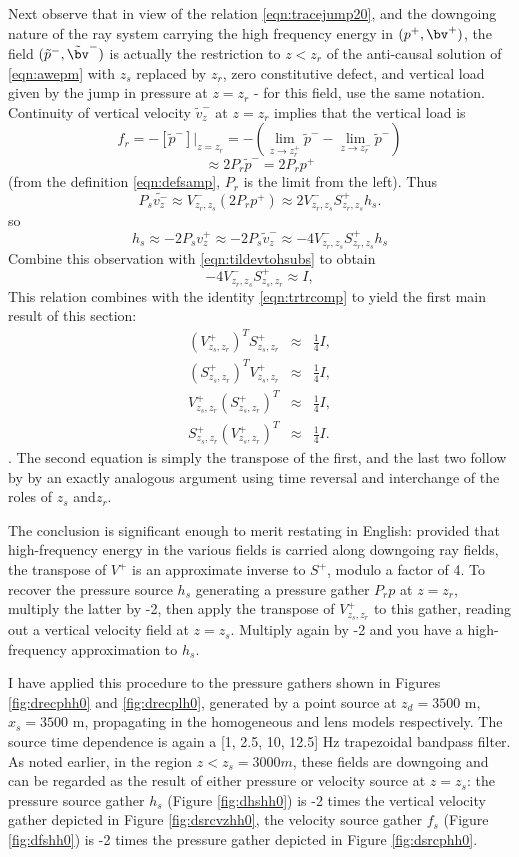 Next observe that in view of the relation \ref{eqn:tracejump20}, and
the downgoing nature of the ray system carrying the high frequency
energy in $(p^+,\bv^+)$, the field $(\tilde{p}^-,\tilde{\bv}^-)$ is
actually the restriction to $z<z_r$ of the anti-causal solution of \ref{eqn:awepm}
with $z_s$ replaced by $z_r$, zero constitutive defect, and vertical
load given by the jump in pressure at $z=z_r$ - for this field, use
the same notation. Continuity of vertical
velocity $\tilde{v}^-_z$ at $z=z_r$ implies that the vertical load is
\[
  f_r = -[\tilde{p}^-]|_{z=z_r} =-(\lim_{z\rightarrow
    z_r^+}\tilde{p}^- - \lim_{z\rightarrow
    z_r^-}\tilde{p}^-)
\]
\[
  \approx 2 P_r \tilde{p}^- = 2 P_r p^+
\]
(from the definition \ref{eqn:defsamp}, $P_r$ is the limit from the
left). Thus
\[
  P_s \tilde{v^-_z} \approx V^-_{z_r,z_s}(2 P_rp^+) \approx
  2V^-_{z_r,z_s}S^+_{z_r,z_s}h_s.
\]
so
\[
  h_s \approx -2 P_s v^+_z \approx -2 P_s \tilde{v}^-_z \approx
  -4V^-_{z_r,z_s}S^+_{z_r,z_s}h_s
\]
Combine this observation with \ref{eqn:tildevtohsubs} to obtain
\[
 -4  V^-_{z_r,z_s} S^+_{z_s,z_r}  \approx  I,
\]
This relation combines with the identity \ref{eqn:trtrcomp} to
yield the first main result of this section:
\begin{eqnarray}
  \label{eqn:approxinv}
  (V^+_{z_s,z_r})^T S^+_{z_s,z_r} & \approx & \frac{1}{4}I, \nonumber\\
  (S^+_{z_s,z_r})^T V^+_{z_s,z_r} & \approx & \frac{1}{4}I, \nonumber\\
  V^+_{z_s,z_r} (S^+_{z_s,z_r})^T & \approx & \frac{1}{4}I, \nonumber\\
  S^+_{z_s,z_r} (V^+_{z_s,z_r})^T & \approx & \frac{1}{4}I.
\end{eqnarray}.
The second equation is simply the transpose of the first, and the
last two follow by by an exactly analogous argument using time
reversal and interchange of the roles of $z_s$ and$z_r$.

The conclusion is significant enough to merit restating in English:
provided that high-frequency energy in the various fields is carried
along downgoing ray fields, the transpose of $V^+$ is an approximate
inverse to $S^+$, modulo a factor of 4. To recover the pressure source
$h_s$ generating a pressure gather $P_rp$ at $z=z_r$, multiply the
latter by -2, then apply the transpose of $V^+_{z_s,z_r}$ to this
gather, reading out a vertical velocity field at $z=z_s$. Multiply
again by -2 and you have a high-frequency approximation to $h_s$.

I have applied this procedure to the pressure gathers shown in Figures
\ref{fig:drecphh0} and \ref{fig:drecplh0}, generated by a point source
at $z_d=3500$ m, $x_s=3500$ m, propagating in the homogeneous and lens
models respectively. The source time dependence is again a [1, 2.5,
10, 12.5] Hz trapezoidal bandpass filter. As noted earlier, in the
region $z < z_s=3000 m$, these fields are downgoing and can be
regarded as the result of either pressure or velocity source at $z=z_s$: the
pressure source gather $h_s$ (Figure \ref{fig:dhshh0})  is -2 times the
vertical velocity gather depicted in Figure \ref{fig:dsrcvzhh0}, the
velocity source gather $f_s$ (Figure \ref{fig:dfshh0}) is -2 times the
pressure gather depicted in Figure \ref{fig:dsrcphh0}.

